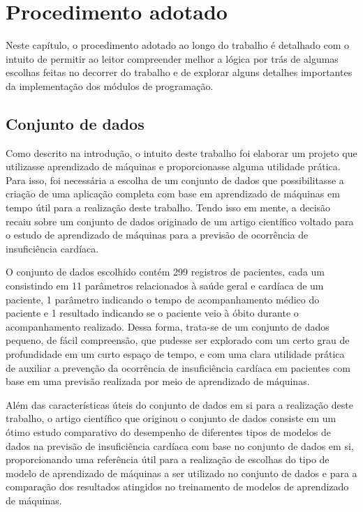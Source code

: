 \chapter{Procedimento adotado} \label{chap:procedimento_adotado}

Neste capítulo, o procedimento adotado ao longo do trabalho é detalhado com o intuito de permitir ao leitor compreender melhor a lógica por trás de algumas escolhas feitas no decorrer do trabalho e de explorar alguns detalhes importantes da implementação dos módulos de programação.

\section{Conjunto de dados}

Como descrito na introdução, o intuito deste trabalho foi elaborar um projeto que utilizasse aprendizado de máquinas e proporcionasse alguma utilidade prática. Para isso, foi necessária a escolha de um conjunto de dados que possibilitasse a criação de uma aplicação completa com base em aprendizado de máquinas em tempo útil para a realização deste trabalho. Tendo isso em mente, a decisão recaiu sobre um conjunto de dados\cite{larxel_dataset} originado de um artigo científico\cite{chicco2020} voltado para o estudo de aprendizado de máquinas para a previsão de ocorrência de insuficiência cardíaca.

O conjunto de dados escolhido\cite{larxel_dataset} contém 299 registros de pacientes, cada um consistindo em 11 parâmetros relacionados à saúde geral e cardíaca de um paciente, 1 parâmetro indicando o tempo de acompanhamento médico do paciente e 1 resultado indicando se o paciente veio à óbito durante o acompanhamento realizado. Dessa forma, trata-se de um conjunto de dados pequeno, de fácil compreensão, que pudesse ser explorado com um certo grau de profundidade em um curto espaço de tempo, e com uma clara utilidade prática de auxiliar a prevenção da ocorrência de insuficiência cardíaca em pacientes com base em uma previsão realizada por meio de aprendizado de máquinas.

Além das características úteis do conjunto de dados em si para a realização deste trabalho, o artigo científico que originou o conjunto de dados\cite{chicco2020} consiste em um ótimo estudo comparativo do desempenho de diferentes tipos de modelos de dados na previsão de insuficiência cardíaca com base no conjunto de dados em si, proporcionando uma referência útil para a realização de escolhas do tipo de modelo de aprendizado de máquinas a ser utilizado no conjunto de dados e para a comparação dos resultados atingidos no treinamento de modelos de aprendizado de máquinas.

